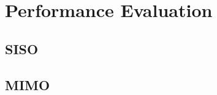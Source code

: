 \chapter{Performance Evaluation}



\section{SISO}\label{sec:siso}
  

%  

\section{MIMO}\label{sec:mimo}
  